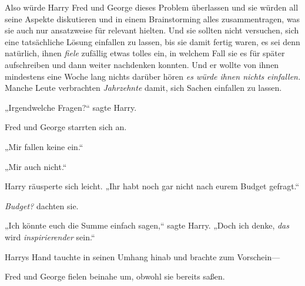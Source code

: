 Also würde Harry Fred und George dieses Problem überlassen und sie würden all seine Aspekte diskutieren und in einem Brainstorming alles zusammentragen, was sie auch nur ansatzweise für relevant hielten. Und sie sollten nicht versuchen, sich eine tatsächliche Lösung einfallen zu lassen, bis sie damit fertig waren, es sei denn natürlich, ihnen \emph{fiele} zufällig etwas tolles ein, in welchem Fall sie es für später aufschreiben und dann weiter nachdenken konnten. Und er wollte von ihnen mindestens eine Woche lang nichts darüber hören \emph{es würde ihnen nichts einfallen.} Manche Leute verbrachten \emph{Jahrzehnte} damit, sich Sachen einfallen zu lassen.

„Irgendwelche Fragen?“ sagte Harry.

Fred und George starrten sich an.

„Mir fallen keine ein.“

„Mir auch nicht.“

Harry räusperte sich leicht. „Ihr habt noch gar nicht nach eurem Budget gefragt.“

\emph{Budget?} dachten sie.

„Ich könnte euch die Summe einfach sagen,“ sagte Harry. „Doch ich denke, \emph{das} wird \emph{inspirierender} sein.“

Harrys Hand tauchte in seinen Umhang hinab und brachte zum Vorschein—

Fred und George fielen beinahe um, obwohl sie bereits saßen.

